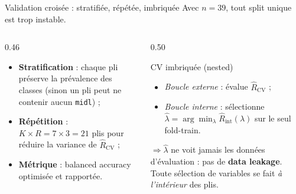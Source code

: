 \documentclass[aspectratio=169, 10pt]{beamer}
\begin{document}
\begin{frame}{Validation croisée : stratifiée, répétée, imbriquée}
  Avec $n = 39$, tout split unique est trop instable.

  \bigskip
  \begin{columns}[T]
    \begin{column}{0.46\textwidth}
      \begin{itemize}
        \item \textbf{Stratification} : chaque pli préserve la prévalence des classes (sinon un pli peut ne contenir aucun \texttt{midl}) ;
        \item \textbf{Répétition} : $K \times R = 7 \times 3 = 21$ plis pour réduire la variance de $\hat{R}_{\text{CV}}$ ;
        \item \textbf{Métrique} : balanced accuracy optimisée et rapportée.
      \end{itemize}
    \end{column}

    \begin{column}{0.50\textwidth}
      \begin{block}{CV imbriquée (nested)}
        \begin{itemize}
          \item \textit{Boucle externe} : évalue $\hat{R}_{\text{CV}}$ ;
          \item \textit{Boucle interne} : sélectionne $\hat{\lambda} = \arg\min_\lambda \hat{R}_{\text{int}}(\lambda)$ sur le seul fold-train.
        \end{itemize}
        $\Rightarrow \hat{\lambda}$ ne voit jamais les données d’évaluation : pas de \textbf{data leakage}. Toute sélection de variables se fait \textit{à l’intérieur} des plis.
      \end{block}
    \end{column}
  \end{columns}
\end{frame}
\end{document}
